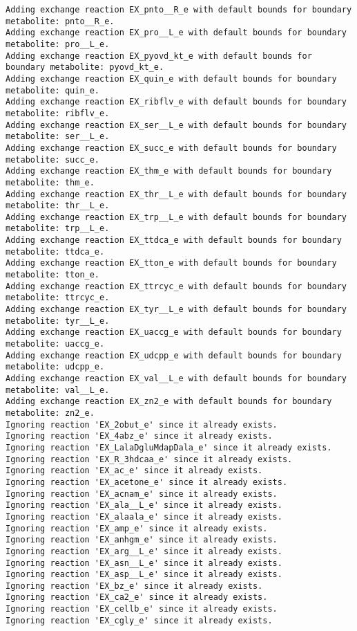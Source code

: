\documentclass[
  letterpaper,
  DIV=11,
  numbers=noendperiod]{scrartcl}
\begin{document}
\begin{verbatim}
Adding exchange reaction EX_pnto__R_e with default bounds for boundary metabolite: pnto__R_e.
Adding exchange reaction EX_pro__L_e with default bounds for boundary metabolite: pro__L_e.
Adding exchange reaction EX_pyovd_kt_e with default bounds for boundary metabolite: pyovd_kt_e.
Adding exchange reaction EX_quin_e with default bounds for boundary metabolite: quin_e.
Adding exchange reaction EX_ribflv_e with default bounds for boundary metabolite: ribflv_e.
Adding exchange reaction EX_ser__L_e with default bounds for boundary metabolite: ser__L_e.
Adding exchange reaction EX_succ_e with default bounds for boundary metabolite: succ_e.
Adding exchange reaction EX_thm_e with default bounds for boundary metabolite: thm_e.
Adding exchange reaction EX_thr__L_e with default bounds for boundary metabolite: thr__L_e.
Adding exchange reaction EX_trp__L_e with default bounds for boundary metabolite: trp__L_e.
Adding exchange reaction EX_ttdca_e with default bounds for boundary metabolite: ttdca_e.
Adding exchange reaction EX_tton_e with default bounds for boundary metabolite: tton_e.
Adding exchange reaction EX_ttrcyc_e with default bounds for boundary metabolite: ttrcyc_e.
Adding exchange reaction EX_tyr__L_e with default bounds for boundary metabolite: tyr__L_e.
Adding exchange reaction EX_uaccg_e with default bounds for boundary metabolite: uaccg_e.
Adding exchange reaction EX_udcpp_e with default bounds for boundary metabolite: udcpp_e.
Adding exchange reaction EX_val__L_e with default bounds for boundary metabolite: val__L_e.
Adding exchange reaction EX_zn2_e with default bounds for boundary metabolite: zn2_e.
Ignoring reaction 'EX_2obut_e' since it already exists.
Ignoring reaction 'EX_4abz_e' since it already exists.
Ignoring reaction 'EX_LalaDgluMdapDala_e' since it already exists.
Ignoring reaction 'EX_R_3hdcaa_e' since it already exists.
Ignoring reaction 'EX_ac_e' since it already exists.
Ignoring reaction 'EX_acetone_e' since it already exists.
Ignoring reaction 'EX_acnam_e' since it already exists.
Ignoring reaction 'EX_ala__L_e' since it already exists.
Ignoring reaction 'EX_alaala_e' since it already exists.
Ignoring reaction 'EX_amp_e' since it already exists.
Ignoring reaction 'EX_anhgm_e' since it already exists.
Ignoring reaction 'EX_arg__L_e' since it already exists.
Ignoring reaction 'EX_asn__L_e' since it already exists.
Ignoring reaction 'EX_asp__L_e' since it already exists.
Ignoring reaction 'EX_bz_e' since it already exists.
Ignoring reaction 'EX_ca2_e' since it already exists.
Ignoring reaction 'EX_cellb_e' since it already exists.
Ignoring reaction 'EX_cgly_e' since it already exists.

\end{verbatim}
\end{document}
